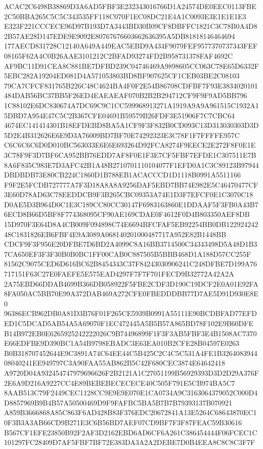 \documentclass[UTF8,fontset=fandol,zihao=-4,a4paper]{ctexart}
\begin{document}
{{ACAC2C6498B38869D3A6AD5FBF3E232343016766D1A24574DE0EEC0113FBE2C50BBA265C5C5C343535FF118C070F1EC08DC21E4A1C0093E3E1E1E1E3
E323F221CCCECE96D97B193D7A3443BD30B09CF8DBFFC1821C3C78B0A4D82B57AE28D147EDE9E9092E80767676603662636395A5DB81818146464694
177AECD831728C12140A649A449EAC5EBD9A434F9079FEF9577370737343FEF08165F62A4C0B26AAE3101212C2BFAD93274FD2B958731378FAF4692C
AF9BC11D91CEA8C881BE7DFBD239C04746469A9898605CC063C78E65D6332F5EBC282A19204ED081D4A571053803BD8BF907625CF1CEB03BE2C08103
79CA7CFCF831765B226C48C4624BA4F0F2E54B86708CDFBF7F93E3834020101484DAB56BC37BB5F26ED4EAEAEAF070B2B2B294712CF9F9F9AD5BB796
1C88102E6DC830674A7DC69C9C1CC599968913271A1919A9A9A961515C1932A15DBD7A954E47C5C2B367CFE04691B59579B26FDF3E51906F7C7CBC64
4674EC141414301B18EFDEBD8BA5A1CF9F3F832B0CD093C13D313030303D3D5D2E4B312626E6E9D3A76009BD7BF70E74292323E3C78F1F7FFFFE957C
C6C6C6C6D0D010BC563033E6E6E693264D92FCA8274F9EECE2E272F8F0E1E3C78F9F3D7BF6CA952BB76EDD7AF8F0E1F3E7CF5FBF7EFDE1C307511E7B
8A6F835C983E7D3AFC42B1A48B2710701110104077F1EFD0A1C3C89123B97944DBDBDB73E80CB224C1860D1B788EB1ACACCCD1D1118B0991A5511166
F9F2E5FCDB727777A7F3D18A8A8A9256DAF5EBD7BB74E982E5C46470477CF3E60D78AD63C78EEDDCB9F3B265CBC09353A74E1D3F7EFCF0E1C3070C18
D0AE5D3B964D0C1E3C189CC80CC30147F6983163860E1DDAAF5F3FB0A43B76ECD8B66D5BF8F774368095CF90AE169CDAE0F4612F0D4B803350AEF8DB
15D970F3E64D8A4CB009F094898C74E6694BFCFAF5EB92254BB0DB12292424248C1831826EB6FBF4E9A3089A068140201000487717A952E82B1448BB
CDCF9F3F956E20DFBE7D6BD2A4099C8A16BB3714500C34343498D5A48D1B37CA650EF3F3F30B0B0BC1FF00CAB0C887505B5BBB468D1A188D57CC255F
81562C9075CED6D616BC62B8454343C37F84243030906241C248DFBE7D199A76717151F63C27E0FAEFE5E575EAD4297F7F7F701FECD9B32772A42A2A
2A75EBD66DDAB4699B366DB058922F5FBE2CDF3D190C19DCF2E0A01E92FA8FA050AC5BB70E99A372DAB469A272CFE0FBEDDDBB77D7AE5D91D930E8E0
96386ECB962DB0A81D3B76F01F265CE5939B0991A55111E90BCDBFAD77EFDED1C5DCAD5AB54A5A69070F1EC472445A5B5B57A865BD78F102E9B60DFE
B14B972EB0E6265925242222026C9B74496899F1F3F3AB5FBF3E4B1508AC7370E66EDFBE9D390BC1A54B9798EBADC3E63EA010B2CFE28B04597E0263
B0B318707452644E9C3891A74C64EE44C5B425C2C4C5C531A4FE1B326408394408040241EE949797C3A90FAA55AB862B5C42F680CEC3874E64642418
A9720D04A932454747979696626F2B2121A1C27051199B56929393D3D2D29A376F2E6A9D216A9227CC4E89BEBEBECECECE40C505F791E5CB974BA5C7
8AAB513C79F2449CEC1128CC9E9E9E070E1CA0734A9C3163064379052C000D4D8857969B9B4B57A50500469D9F9FAFBC5BA5B7B7B79393137B070921
A859B3666868A85C863F6AD428B83F376EDC20672841A13E5264C68643870EC10F3B3A3AB66CD9B271E3C6B56BD7AEF07CD9BF7F3F87FEAC59B30616
B567CF1EFE23850B92F2AF3D2162EBD6AD6CF6A261C386454444F06FCEC1C101297FC28409D7AF5FBF7BF72E383DA3A2A2DEBE7D0B4EEA8C8C8C3F7F
}}
\end{document}
